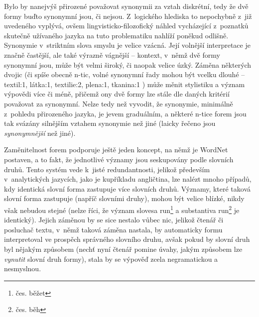 \documentclass[a4paper, 11pt, oneside, showtrims]{book}
\newcommand\ex{\textsf}
\begin{document}
					Bylo by nanejvýš přirozené považovat synonymii za vztah diskrétní, tedy že dvě formy buďto synonymní jsou, či nejsou. Z~logického hlediska to nepochybně z~již uvedeného vyplývá, ovšem lingvisticko-filozofický náhled vycházející z~poznatků skutečně užívaného jazyka na tuto problematiku nahlíží poněkud odlišně. Synonymie v~striktním slova smyslu je velice vzácná. Její volnější interpretace je značně častější, ale také výrazně vágnější -- kontext, v~němž dvě formy synonymní jsou, může být velmi široký, či naopak velice úzký. Záměna některých dvojic (či spíše obecně n-tic, volné synonymní řady mohou být vcelku dlouhé -- \ex{textil:1, látka:1, textilie:2, plena:1, tkanina:1} \parencite{pala2004building}) může měnit stylistiku a význam výpovědi více či méně, přičemž ony dvě formy lze stále dle daných kritérií považovat za synonymní. Nelze tedy než vyvodit, že synonymie, minimálně z~pohledu přirozeného jazyka, je jevem graduálním, a některé n-tice forem jsou tak svázány silnějším vztahem synonymie než jiné (laicky řečeno jsou \textit{synonymnější} než jiné). \parencite{miller1990introduction}

					Zaměnitelnost forem podporuje ještě jeden koncept, na němž je WordNet postaven, a to fakt, že jednotlivé významy jsou seskupovány podle slovních druhů. Tento systém vede k~jisté redundantnosti, jelikož především v~analytických jazycích, jako je kupříkladu angličtina, lze nalézt mnoho případů, kdy identická slovní forma zastupuje více slovních druhů. Významy, které taková slovní forma zastupuje (napříč slovními druhy), mohou být velice blízké, nikdy však nebudou stejné (nelze říci, že význam slovesa \ex{run}\footnote{čes. \ex{běžet}} a substantiva \ex{run}\footnote{čes. \ex{běh}} je identický). Jejich záměnou by se sice nestalo vůbec nic, jelikož čtenář či posluchač textu, v~němž taková záměna nastala, by automaticky formu interpretoval ve prospěch správného slovního druhu, avšak pokud by slovní druh byl nějakým způsobem  (nechť nyní čtenář pomine úvahy, jakým způsobem lze \textit{vynutit} slovní druh formy), stala by se výpověď zcela negramatickou a nesmyslnou. 
\end{document}
